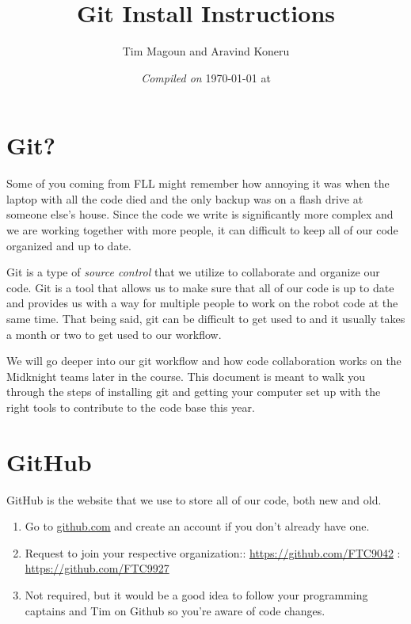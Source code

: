 \documentclass[11pt,fleqn]{article}
\begin{document}
\title{Git Install Instructions}%
\author{Tim Magoun and Aravind Koneru}
\date{\textit{Compiled on} \today \hspace{1mm} at \currenttime}
\maketitle

\section*{Git?}
Some of you coming from FLL might remember how annoying it was when the laptop with all the code died and
the only backup was on a flash drive at someone else's house. Since the code we write is
significantly more complex and we are working together with more people, it can difficult to keep
all of our code organized and up to date. 

Git is a type of \textit{source control} that we utilize to collaborate and organize our code. Git is 
a tool that allows us to make sure that all of our code is up to date and provides us with a way for
multiple people to work on the robot code at the same time. That being said, git can be difficult
to get used to and it usually takes a month or two to get used to our workflow. 

We will go deeper into our git workflow and how code collaboration works on the Midknight 
teams later in the course. This document is meant to walk you through the steps of installing git
and getting your computer set up with the right tools to contribute to the code base this year.  

\section*{GitHub}
GitHub is the website that we use to store all of our code, both new and old.

\begin{enumerate}
    \item
        Go to \url{github.com} and create an account if you don't already have one.

    \item
        Request to join your respective organization:: \url{https://github.com/FTC9042} : \url{https://github.com/FTC9927}

    \item
        Not required, but it would be a good idea to follow your programming captains and Tim on
        Github so you're aware of code changes. 

\end{enumerate}
\end{document}
